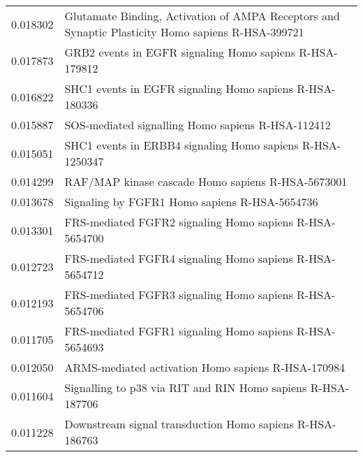 \begin{longtable}{p{2.4cm}p{14.5cm}}
                 0.018302 &                  Glutamate Binding, Activation of AMPA Receptors and Synaptic Plasticity Homo sapiens R-HSA-399721 \\
                 0.017873 &                                                            GRB2 events in EGFR signaling Homo sapiens R-HSA-179812 \\
                 0.016822 &                                                            SHC1 events in EGFR signaling Homo sapiens R-HSA-180336 \\
                 0.015887 &                                                                  SOS-mediated signalling Homo sapiens R-HSA-112412 \\
                 0.015051 &                                                          SHC1 events in ERBB4 signaling Homo sapiens R-HSA-1250347 \\
                 0.014299 &                                                                  RAF/MAP kinase cascade Homo sapiens R-HSA-5673001 \\
                 0.013678 &                                                                      Signaling by FGFR1 Homo sapiens R-HSA-5654736 \\
                 0.013301 &                                                            FRS-mediated FGFR2 signaling Homo sapiens R-HSA-5654700 \\
                 0.012723 &                                                            FRS-mediated FGFR4 signaling Homo sapiens R-HSA-5654712 \\
                 0.012193 &                                                            FRS-mediated FGFR3 signaling Homo sapiens R-HSA-5654706 \\
                 0.011705 &                                                            FRS-mediated FGFR1 signaling Homo sapiens R-HSA-5654693 \\
                 0.012050 &                                                                 ARMS-mediated activation Homo sapiens R-HSA-170984 \\
                 0.011604 &                                                        Signalling to p38 via RIT and RIN Homo sapiens R-HSA-187706 \\
                 0.011228 &                                                           Downstream signal transduction Homo sapiens R-HSA-186763 \\

\end{longtable}

